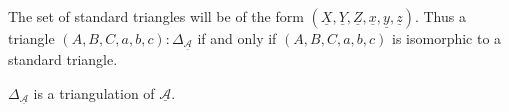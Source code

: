     \begin{minipage}[c]{0.6\textwidth}
        \begin{center}
        \end{center}
    \end{minipage}
    \begin{minipage}[c]{0.4\textwidth}
        The set of standard triangles will be of the form $(\underline{X},\underline{Y},\underline{Z},\underline{x},\underline{y},\underline{z})$. Thus a triangle $(A,B,C,a,b,c):\Delta_{\underline{\mathcal{A}}}$ if and only if $(A,B,C,a,b,c)$ is isomorphic to a standard triangle.
    \end{minipage}

    \begin{prop}
        $\Delta_{\underline{\mathcal{A}}}$ is a triangulation of $\underline{\mathcal{A}}$.
    \end{prop}

